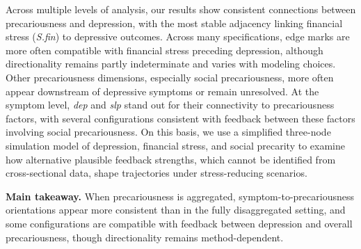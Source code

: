 \documentclass[
]{article}
\begin{document}
Across multiple levels of analysis, our results show consistent
connections between precariousness and depression, with the most stable
adjacency linking financial stress (\textit{S.fin}) to depressive
outcomes. Across many specifications, edge marks are more often
compatible with financial stress preceding depression, although
directionality remains partly indeterminate and varies with modeling
choices. Other precariousness dimensions, especially social
precariousness, more often appear downstream of depressive symptoms or
remain unresolved. At the symptom level, \textit{dep} and \textit{slp}
stand out for their connectivity to precariousness factors, with several
configurations consistent with feedback between these factors involving
social precariousness. On this basis, we use a simplified three-node
simulation model of depression, financial stress, and social precarity
to examine how alternative plausible feedback strengths, which cannot be
identified from cross-sectional data, shape trajectories under
stress-reducing scenarios.

\textbf{Main takeaway.} When precariousness is aggregated,
symptom-to-precariousness orientations appear more consistent than in
the fully disaggregated setting, and some configurations are compatible
with feedback between depression and overall precariousness, though
directionality remains method-dependent.

\end{document}

